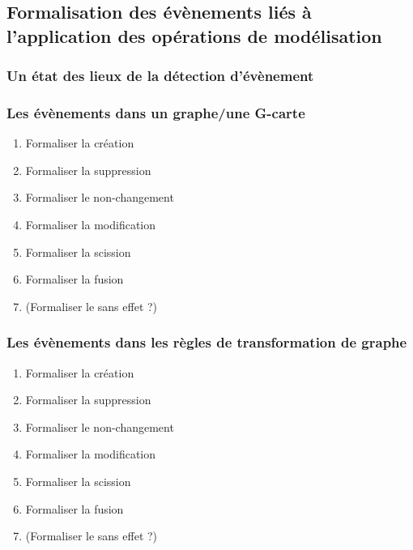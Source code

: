 \documentclass[11pt]{article}
\begin{document}
\subsection{Formalisation des évènements liés à l'application des opérations de modélisation}
\label{sec:org629a912}
\subsubsection{Un état des lieux de la détection d'évènement}
\label{sec:org5ad7613}
\subsubsection{Les évènements dans un graphe/une G-carte}
\label{sec:org64acdc5}
\begin{enumerate}
\item Formaliser la création
\label{sec:org9ea4717}
\item Formaliser la suppression
\label{sec:org9f42cfb}
\item Formaliser le non-changement
\label{sec:org65ba127}
\item Formaliser la modification
\label{sec:orgee3c261}
\item Formaliser la scission
\label{sec:org1f03155}
\item Formaliser la fusion
\label{sec:org49689fe}
\item (Formaliser le sans effet ?)
\label{sec:org3102c7b}
\end{enumerate}
\subsubsection{Les évènements dans les règles de transformation de graphe}
\label{sec:org8382405}
\begin{enumerate}
\item Formaliser la création
\label{sec:orgd3d3d2a}
\item Formaliser la suppression
\label{sec:org017dd76}
\item Formaliser le non-changement
\label{sec:org83b4051}
\item Formaliser la modification
\label{sec:org21c2105}
\item Formaliser la scission
\label{sec:org879d2a1}
\item Formaliser la fusion
\label{sec:orgbdc1462}
\item (Formaliser le sans effet ?)
\label{sec:org0cf3004}
\end{enumerate}
\end{document}
